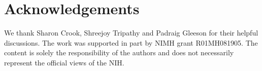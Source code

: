 \documentclass[9pt]{sig-alternate}
\begin{document}

\section*{Acknowledgements}
We thank Sharon Crook, Shreejoy Tripathy and Padraig Gleeson for their helpful discussions.  
The work was supported in part by NIMH grant R01MH081905. 
The content is solely the responsibility of the authors and does not necessarily represent the official views of the NIH.





%
%
%


%

%
%


%
%
%




\end{document}

